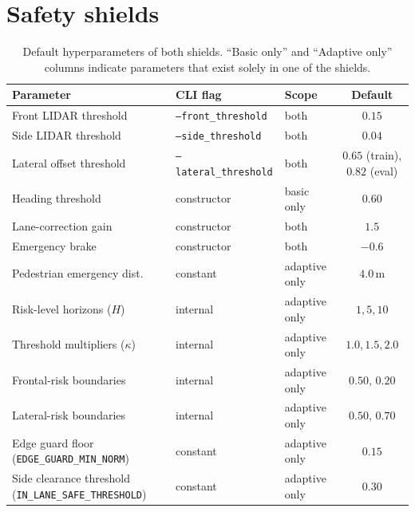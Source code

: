 \section{Safety shields}\label{app:hp-shields}

\begin{table}[H]
  \centering
  \caption{Default hyperparameters of both shields. ``Basic only'' and ``Adaptive only'' columns
           indicate parameters that exist solely in one of the shields.}
  \label{tab:hp-shields}
  \small
  \begin{tabular}{@{}lllc@{}}
    \toprule
    \textbf{Parameter} & \textbf{CLI flag} & \textbf{Scope} & \textbf{Default} \\
    \midrule
    Front LIDAR threshold    & \texttt{--front\_threshold}   & both            & \(0.15\) \\
    Side LIDAR threshold     & \texttt{--side\_threshold}    & both            & \(0.04\) \\
    Lateral offset threshold & \texttt{--lateral\_threshold} & both            & \(0.65\) (train), \(0.82\) (eval) \\
    Heading threshold        & constructor                   & basic only      & \(0.60\) \\
    Lane-correction gain     & constructor                   & both            & \(1.5\) \\
    Emergency brake          & constructor                   & both            & \(-0.6\) \\
    Pedestrian emergency dist.& constant                     & adaptive only   & \(4.0\,\mathrm{m}\) \\
    Risk-level horizons (\(H\))& internal                    & adaptive only   & \(1, 5, 10\) \\
    Threshold multipliers (\(\kappa\))& internal              & adaptive only   & \(1.0, 1.5, 2.0\) \\
    Frontal-risk boundaries  & internal                      & adaptive only   & \(0.50,\, 0.20\) \\
    Lateral-risk boundaries  & internal                      & adaptive only   & \(0.50,\, 0.70\) \\
    Edge guard floor (\texttt{EDGE\_GUARD\_MIN\_NORM}) & constant & adaptive only & \(0.15\) \\
    Side clearance threshold (\texttt{IN\_LANE\_SAFE\_THRESHOLD}) & constant & adaptive only & \(0.30\) \\
    \bottomrule
  \end{tabular}
\end{table}

